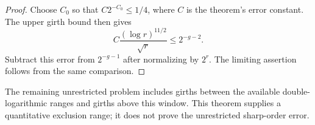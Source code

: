 \begin{proof}
Choose $C_0$ so that $C2^{-C_0}\le1/4$, where $C$ is the theorem's error constant.
The upper girth bound then gives
\[
 C\frac{(\log r)^{11/2}}{\sqrt r}
 \le2^{-g-2}.
\]
Subtract this error from $2^{-g-1}$ after normalizing by $2^r$.
The limiting assertion follows from the same comparison.
\end{proof}

The remaining unrestricted problem includes girths between the available double-logarithmic ranges and girths above this window.
This theorem supplies a quantitative exclusion range; it does not prove the unrestricted sharp-order error.
